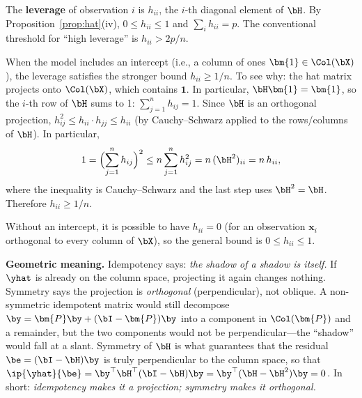 
\begin{definition}
The \textbf{leverage} of observation $i$ is $h_{ii}$, the $i$-th diagonal
element of $\bH$. By Proposition~\ref{prop:hat}(iv),
$0 \le h_{ii} \le 1$ and $\sum_i h_{ii} = p$.
The conventional threshold for ``high leverage'' is $h_{ii} > 2p/n$.
\end{definition}

\begin{remark}\label{rem:hii-intercept}
When the model includes an intercept (i.e., a column of ones $\bm{1}\in\Col(\bX)$),
the leverage satisfies the stronger bound $h_{ii}\ge 1/n$.
To see why: the hat matrix projects onto $\Col(\bX)$, which contains $\bm{1}$.
In particular, $\bH\bm{1} = \bm{1}$, so the $i$-th row of $\bH$ sums to 1:
$\sum_{j=1}^n h_{ij} = 1$.
Since $\bH$ is an orthogonal projection, $h_{ij}^2 \le h_{ii}\cdot h_{jj} \le h_{ii}$
(by Cauchy--Schwarz applied to the rows/columns of $\bH$).  In particular,
\[
  1 = \Bigl(\sum_{j=1}^n h_{ij}\Bigr)^2
  \le n\sum_{j=1}^n h_{ij}^2
  = n\,(\bH^2)_{ii}
  = n\,h_{ii},
\]
where the inequality is Cauchy--Schwarz and the last step uses $\bH^2 = \bH$.
Therefore $h_{ii}\ge 1/n$.

Without an intercept, it is possible to have $h_{ii} = 0$ (for an observation
$\bm{x}_i$ orthogonal to every column of $\bX$), so the general bound is
$0 \le h_{ii} \le 1$.
\end{remark}




\noindent\textbf{Geometric meaning.}
Idempotency says: \emph{the shadow of a shadow is itself.}
If $\yhat$ is already on the column space, projecting it again
changes nothing.
Symmetry says the projection is \emph{orthogonal} (perpendicular), not
oblique.
A non-symmetric idempotent matrix would still decompose
$\by = \bm{P}\by + (\bI - \bm{P})\by$ into a component in $\Col(\bm{P})$
and a remainder, but the two components would not be perpendicular---the
``shadow'' would fall at a slant.
Symmetry of $\bH$ is what guarantees that the residual $\be = (\bI-\bH)\by$
is truly perpendicular to the column space, so that
$\ip{\yhat}{\be} = \by^\top\bH^\top(\bI-\bH)\by = \by^\top(\bH - \bH^2)\by = 0$.
In short: \emph{idempotency makes it a projection; symmetry makes it orthogonal.}


